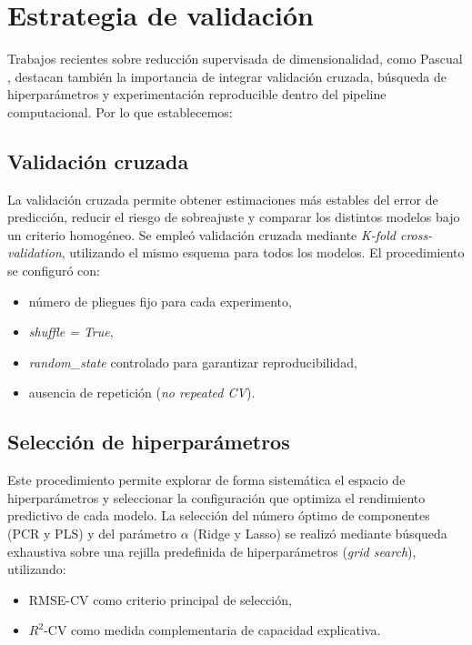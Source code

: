 \documentclass[12pt,a4paper]{report}
\begin{document}
\section{Estrategia de validación}

Trabajos recientes sobre reducción supervisada de dimensionalidad, como Pascual \cite{pascual2020}, destacan también la importancia de integrar validación cruzada, búsqueda de hiperparámetros y experimentación reproducible dentro del pipeline computacional. Por lo que establecemos:

\subsection{Validación cruzada}

La validación cruzada permite obtener estimaciones más estables del error de predicción, reducir el riesgo de sobreajuste y comparar los distintos modelos bajo un criterio homogéneo. Se empleó validación cruzada mediante \textit{K-fold cross-validation}, utilizando el mismo esquema para todos los modelos. El procedimiento se configuró con:

\begin{itemize}
    \item número de pliegues fijo para cada experimento,
    \item \textit{shuffle = True},
    \item \textit{random\_state} controlado para garantizar reproducibilidad,
    \item ausencia de repetición (\textit{no repeated CV}).
\end{itemize}


\subsection{Selección de hiperparámetros}

Este procedimiento permite explorar de forma sistemática el espacio de hiperparámetros y seleccionar la configuración que optimiza el rendimiento predictivo de cada modelo. La selección del número óptimo de componentes (PCR y PLS) y del parámetro $\alpha$ (Ridge y Lasso) se realizó mediante búsqueda exhaustiva sobre una rejilla predefinida de hiperparámetros (\textit{grid search}), utilizando:

\begin{itemize}
    \item RMSE-CV como criterio principal de selección,
    \item $R^{2}$-CV como medida complementaria de capacidad explicativa.
\end{itemize}
\end{document}
